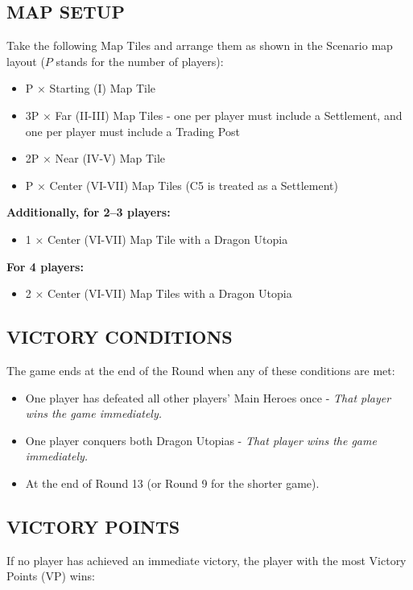 \begin{multicols*}{2}
\subsection*{\MakeUppercase{Map Setup}}
Take the following Map Tiles and arrange them as shown in the Scenario map layout ($P$ stands for the number of players):

\begin{itemize}
  \item P × Starting (I) Map Tile
  \item 3P × Far (II-III) Map Tiles - one per player must include a Settlement, and one per player must include a Trading Post
  \item 2P × Near (IV-V) Map Tile
  \item P × Center (VI-VII) Map Tiles (C5 is treated as a Settlement)
\end{itemize}

\textbf{Additionally, for 2--3 players:}
\begin{itemize}
  \item 1 × Center (VI-VII) Map Tile with a Dragon Utopia
\end{itemize}

\textbf{For 4 players:}
\begin{itemize}
  \item 2 × Center (VI-VII) Map Tiles with a Dragon Utopia
\end{itemize}

\subsection*{\MakeUppercase{Victory Conditions}}
The game ends at the end of the Round when any of these conditions are met:

\begin{itemize}
 \item One player has defeated all other players' Main Heroes once - \textit{That player wins the game immediately.}
 \item One player conquers both Dragon Utopias - \textit{That player wins the game immediately.}
 \item At the end of Round 13 (or Round 9 for the shorter game).
\end{itemize}

\subsection*{\MakeUppercase{Victory Points}}
If no player has achieved an immediate victory, the player with the most Victory Points (VP) wins:


\end{multicols*}
